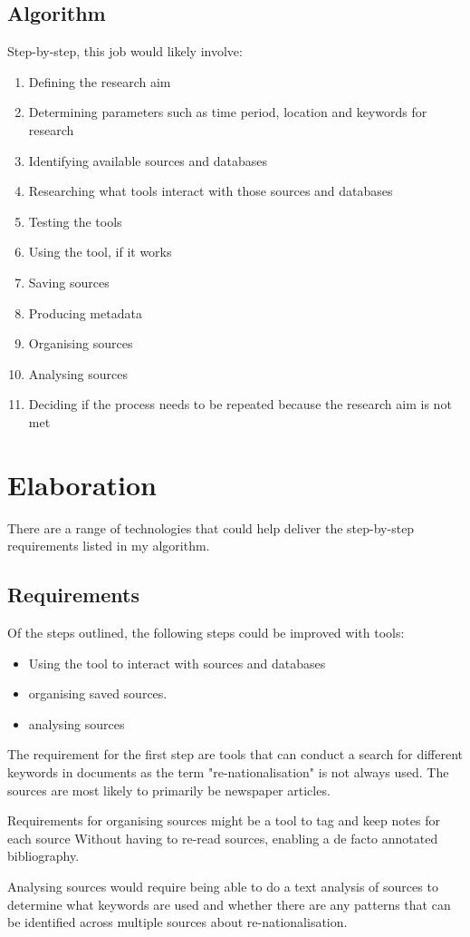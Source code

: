 \documentclass{article}
\begin{document}
\subsection*{Algorithm}
Step-by-step, this job would likely involve:
\begin{enumerate}
\item Defining the research aim
\item Determining parameters such as time period, location and keywords for research
\item Identifying available sources and databases
\item Researching what tools interact with those sources and databases
\item Testing the tools
\item Using the tool, if it works
\item Saving sources
\item Producing metadata
\item Organising sources
\item Analysing sources
\item Deciding if the process needs to be repeated because the research aim is not met
\end{enumerate}

\section*{Elaboration}

There are a range of technologies that could help deliver the step-by-step requirements listed in my algorithm.

\subsection*{Requirements}

Of the steps outlined, the following steps could be improved with tools:
\begin{itemize}
\item Using the tool to interact with sources and databases
\item organising saved sources.
\item analysing sources 
\end{itemize}\par

The requirement for the first step are tools that can conduct a search for different keywords in documents as the term "re-nationalisation" is not always used. The sources are most likely to primarily be newspaper articles.\par
\par
Requirements for organising sources might be a tool to tag and keep notes for each source Without having to re-read sources, enabling a de facto annotated bibliography.
\par
Analysing sources would require being able to do a text analysis of sources to determine what keywords are used and whether there are any patterns that can be identified across multiple sources about re-nationalisation.
\par
\end{document}
